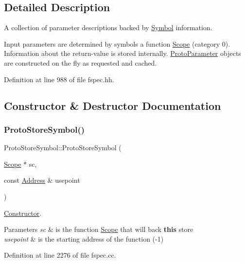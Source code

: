 \subsection{Detailed Description}
A collection of parameter descriptions backed by \mbox{\hyperlink{class_symbol}{Symbol}} information. 

Input parameters are determined by symbols a function \mbox{\hyperlink{class_scope}{Scope}} (category 0). Information about the return-\/value is stored internally. \mbox{\hyperlink{class_proto_parameter}{Proto\+Parameter}} objects are constructed on the fly as requested and cached. 

Definition at line 988 of file fspec.\+hh.



\subsection{Constructor \& Destructor Documentation}
\mbox{\label{class_proto_store_symbol_ac124539bc8682646d3cd44dcb84ee960}} 
\subsubsection{\texorpdfstring{ProtoStoreSymbol()}{ProtoStoreSymbol()}}
{\footnotesize\ttfamily Proto\+Store\+Symbol\+::\+Proto\+Store\+Symbol (\begin{DoxyParamCaption}\item[{\mbox{\hyperlink{class_scope}{Scope}} $\ast$}]{sc,  }\item[{const \mbox{\hyperlink{class_address}{Address}} \&}]{usepoint }\end{DoxyParamCaption})}



\mbox{\hyperlink{class_constructor}{Constructor}}. 


\begin{DoxyParams}{Parameters}
{\em sc} & is the function \mbox{\hyperlink{class_scope}{Scope}} that will back {\bfseries{this}} store \\
\hline
{\em usepoint} & is the starting address of the function (-\/1) \\
\hline
\end{DoxyParams}


Definition at line 2276 of file fspec.\+cc.

